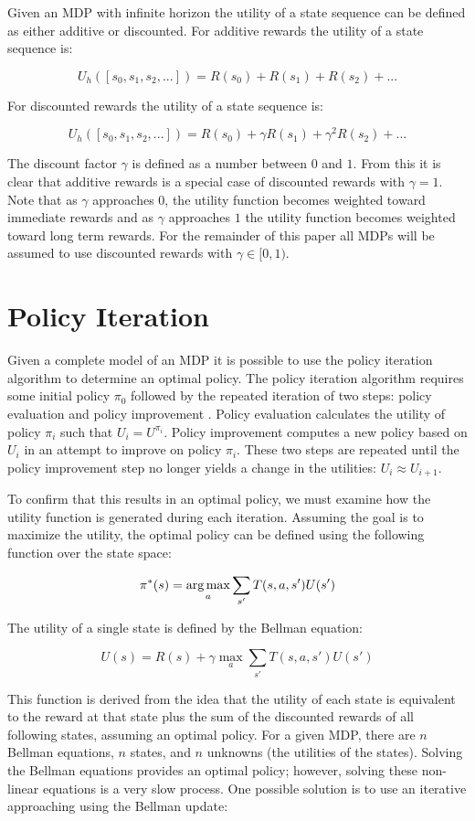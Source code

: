 Given an MDP with infinite horizon the utility of a state sequence can be defined as either additive or discounted. For additive rewards the utility of a state sequence is:

\[
    U_h([s_0,s_1,s_2,...]) = R(s_0) + R(s_1) + R(s_2) + ...
\]

For discounted rewards the utility of a state sequence is:

\[
    U_h([s_0,s_1,s_2,...]) = R(s_0) + \gamma R(s_1) + \gamma^2 R(s_2) + ...
\]

The discount factor $\gamma$ is defined as a number between $0$ and $1$. From this it is clear that additive rewards is a special case of discounted rewards with $\gamma = 1$.  Note that as $\gamma$ approaches $0$, the utility function becomes weighted toward immediate rewards and as $\gamma$ approaches $1$ the utility function becomes weighted toward long term rewards. For the remainder of this paper all MDPs will be assumed to use discounted rewards with $\gamma \in [0, 1)$.

\section{Policy Iteration}

Given a complete model of an MDP it is possible to use the policy iteration algorithm to determine an optimal policy. The policy iteration algorithm requires some initial policy $\pi_0$ followed by the repeated iteration of two steps: policy evaluation and policy improvement \cite{norvig}. Policy evaluation calculates the utility of policy $\pi_i$ such that $U_i = U^{\pi_i}$. Policy improvement computes a new policy based on $U_i$ in an attempt to improve on policy $\pi_i$. These two steps are repeated until the policy improvement step no longer yields a change in the utilities: $U_i \approx U_{i+1}$.

To confirm that this results in an optimal policy, we must examine how the utility function is generated during each iteration. Assuming the goal is to maximize the utility, the optimal policy can be defined using the following function over the state space:

\[
    \pi^*(s) = \operatorname*{arg\,max}_a \sum_{s'} T(s,a,s')U(s')
\]

The utility of a single state is defined by the Bellman equation:

\[
    U(s) = R(s) + \gamma \max_a \sum_{s'}T(s,a,s')U(s')
\]

This function is derived from the idea that the utility of each state is equivalent to the reward at that state plus the sum of the discounted rewards of all following states, assuming an optimal policy. For a given MDP, there are $n$ Bellman equations, $n$ states, and $n$ unknowns (the utilities of the states). Solving the Bellman equations provides an optimal policy; however, solving these non-linear equations is a very slow process. One possible solution is to use an iterative approaching using the Bellman update:

